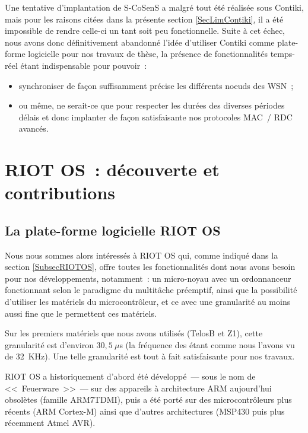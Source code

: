\label{PtEchecSCosensContiki}
Une tentative d'implantation de S-CoSenS a malgré tout été réalisée
sous Contiki, mais pour les raisons citées dans la présente section
\ref{SecLimContiki}, il a été impossible de rendre celle-ci un tant soit
peu fonctionnelle. Suite à cet échec, nous avons donc définitivement
abandonné l'idée d'utiliser Contiki comme plate-forme logicielle pour
nos travaux de thèse, la présence de fonctionnalités temps-réel étant
indispensable pour pouvoir~:
\begin{itemize}
\item synchroniser de façon suffisamment précise les différents noeuds 
des WSN~;
\item ou même, ne serait-ce que pour respecter les durées des diverses
périodes délais et donc implanter de façon satisfaisante nos protocoles
MAC~/ RDC avancés.
\end{itemize}


\section{RIOT OS~: découverte et contributions}
\label{SecRIOTContrib}


\subsection{La plate-forme logicielle RIOT OS}
\label{SubSecPFRIOT}

Nous nous sommes alors intéressés à RIOT OS qui, comme indiqué dans
la section \vref{SubsecRIOTOS}, offre toutes les fonctionnalités dont
nous avons besoin pour nos développements, notamment~: un micro-noyau avec
un ordonnanceur fonctionnant selon le paradigme du multitâche préemptif,
ainsi que la possibilité d'utiliser les  matériels du
microcontrôleur, et ce avec une granularité au moins aussi fine
que le permettent ces  matériels.

Sur les premiers matériels que nous avons utilisés (TelosB et Z1), cette
granularité est d'environ $30,5~\mu$s (la fréquence des 
étant comme nous l'avons vu de 32~KHz). Une telle granularité est tout
à fait satisfaisante pour nos travaux.

RIOT OS a historiquement d'abord été développé~--- sous le nom de
<<~Feuerware~>>~--- sur des appareils à architecture ARM aujourd'hui
obsolètes (famille ARM7\-TDMI), puis a été porté sur des microcontrôleurs
plus récents (ARM Cortex-M) ainsi que d'autres architectures (MSP430
puis plus récemment Atmel AVR).

